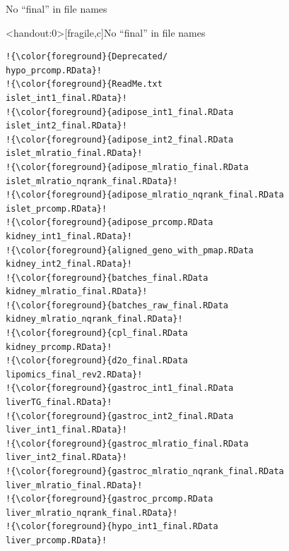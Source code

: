 \documentclass[aspectratio=169,12pt,t]{beamer}
\begin{document}
\begin{frame}[c]{No ``{\hilit final}'' in file names}

\vspace*{3mm}

\centering


\end{frame}



\begin{frame}<handout:0>[fragile,c]{No ``{\hilit final}'' in file names}


\addtocounter{framenumber}{-1}


\begin{center}
\begin{minipage}[c]{9.5cm}
\begin{semiverbatim}
\lstset{basicstyle=\tiny}
\begin{lstlisting}[escapechar=!,linewidth=9.5cm]
!{\color{foreground}{Deprecated/                            hypo_prcomp.RData}!
!{\color{foreground}{ReadMe.txt                             islet_int1_final.RData}!
!{\color{foreground}{adipose_int1_final.RData               islet_int2_final.RData}!
!{\color{foreground}{adipose_int2_final.RData               islet_mlratio_final.RData}!
!{\color{foreground}{adipose_mlratio_final.RData            islet_mlratio_nqrank_final.RData}!
!{\color{foreground}{adipose_mlratio_nqrank_final.RData     islet_prcomp.RData}!
!{\color{foreground}{adipose_prcomp.RData                   kidney_int1_final.RData}!
!{\color{foreground}{aligned_geno_with_pmap.RData           kidney_int2_final.RData}!
!{\color{foreground}{batches_final.RData                    kidney_mlratio_final.RData}!
!{\color{foreground}{batches_raw_final.RData                kidney_mlratio_nqrank_final.RData}!
!{\color{foreground}{cpl_final.RData                        kidney_prcomp.RData}!
!{\color{foreground}{d2o_final.RData                        lipomics_final_rev2.RData}!
!{\color{foreground}{gastroc_int1_final.RData               liverTG_final.RData}!
!{\color{foreground}{gastroc_int2_final.RData               liver_int1_final.RData}!
!{\color{foreground}{gastroc_mlratio_final.RData            liver_int2_final.RData}!
!{\color{foreground}{gastroc_mlratio_nqrank_final.RData     liver_mlratio_final.RData}!
!{\color{foreground}{gastroc_prcomp.RData                   liver_mlratio_nqrank_final.RData}!
!{\color{foreground}{hypo_int1_final.RData                  liver_prcomp.RData}!

\end{lstlisting}
\end{semiverbatim}
\end{minipage}
\end{center}
\end{frame}
\end{document}
